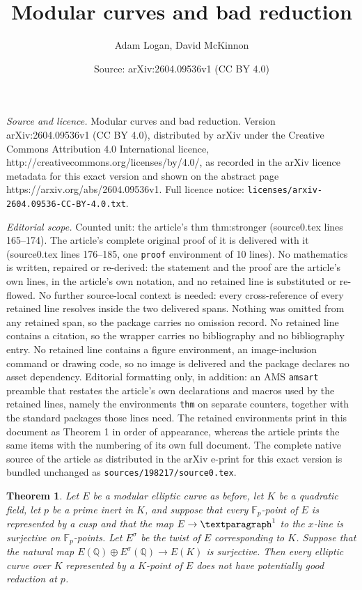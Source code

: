 \documentclass[10pt,a4paper]{amsart}
\title{Modular curves and bad reduction}
\author{Adam Logan, David McKinnon}
\date{Source: arXiv:2604.09536v1 (CC BY 4.0)}
\def\Q{{\mathbb Q}}
\def\F{{\mathbb F}}
\newtheorem{thm}{Theorem}
\begin{document}
\maketitle

\noindent\emph{Source and licence.} Modular curves and bad reduction. Version arXiv:2604.09536v1 (CC BY 4.0), distributed by arXiv under the Creative Commons Attribution 4.0 International licence, http://creativecommons.org/licenses/by/4.0/, as recorded in the arXiv licence metadata for this exact version and shown on the abstract page https://arxiv.org/abs/2604.09536v1. Full licence notice: \texttt{licenses/arxiv-2604.09536-CC-BY-4.0.txt}.\par\smallskip

\noindent\textit{Editorial scope.} Counted unit: the article's thm thm:stronger (source0.tex lines 165--174). The article's complete original proof of it is delivered with it (source0.tex lines 176--185, one \texttt{proof} environment of 10 lines). No mathematics is written, repaired or re-derived: the statement and the proof are the article's own lines, in the article's own notation, and no retained line is substituted or re-flowed.  No further source-local context is needed: every cross-reference of every retained line resolves inside the two delivered spans.  Nothing was omitted from any retained span, so the package carries no omission record.  No retained line contains a citation, so the wrapper carries no bibliography and no bibliography entry.  No retained line contains a figure environment, an image-inclusion command or drawing code, so no image is delivered and the package declares no asset dependency.  Editorial formatting only, in addition: an AMS \texttt{amsart} preamble that restates the article's own declarations and macros used by the retained lines, namely the environments \texttt{thm} on separate counters, together with the standard packages those lines need.  The retained environments print in this document as Theorem 1 in order of appearance, whereas the article prints the same items with the numbering of its own full document.  The complete native source of the article as distributed in the arXiv e-print for this exact version is bundled unchanged as \texttt{sources/198217/source0.tex}.
\begin{thm}\label{thm:stronger}
  Let $E$ be a modular elliptic curve as before, let $K$ be a quadratic
  field, let $p$ be a prime inert in $K$, and suppose that every $\F_p$-point
  of $E$ is represented by a cusp and that the map $E \to \P^1$ to the
  $x$-line is surjective on $\F_p$-points.  Let $E^\sigma$ be the twist of
  $E$ corresponding to $K$.  Suppose that the natural map
  $E(\Q) \oplus E^\sigma(\Q) \to E(K)$ is surjective.  Then every elliptic
  curve over $K$ represented by a $K$-point of $E$ does not have potentially
  good reduction at $p$.
\end{thm}
\end{document}
